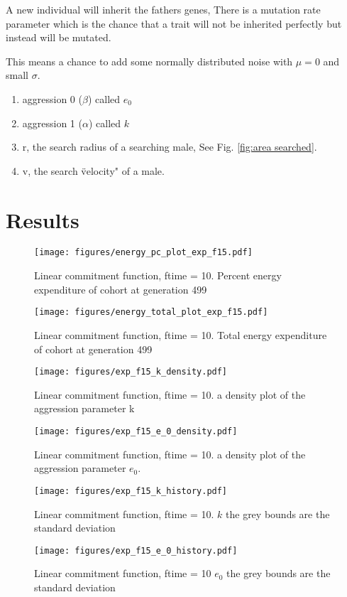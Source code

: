 \documentclass[a4paper,11pt]{article}
\begin{document}
A new individual will inherit the fathers genes,
There is a mutation rate parameter which is the chance that a trait will not be inherited perfectly but instead will be mutated.

This means a chance to add some normally distributed noise with $\mu = 0$ and small $\sigma$.

\begin{enumerate}
    \item aggression 0 ($\beta$) called $e_0$
    \item aggression 1 ($\alpha$) called $k$
    
    \item r, the search radius of a searching male, See Fig. \ref{fig:area searched}.
    \item v, the search \"velocity" of a male.
\end{enumerate}

\clearpage

\section{Results} %
\label{sec:results}
\begin{figure}[h!]
    \centering
    \texttt{[image: figures/energy\_pc\_plot\_exp\_f15.pdf]}
    \caption{Linear commitment function, ftime = 10. Percent energy expenditure of cohort at generation 499}
    \label{fig:var energy pc}
    \centering

    \texttt{[image: figures/energy\_total\_plot\_exp\_f15.pdf]}
    \caption{Linear commitment function, ftime = 10. Total energy expenditure of cohort at generation 499}
    \label{fig:var energy total}
\end{figure}

\begin{figure}[h!]
    \centering
    \texttt{[image: figures/exp\_f15\_k\_density.pdf]}
    \caption{Linear commitment function, ftime = 10. a density plot of the aggression parameter k}
    \label{fig:k density}

    \texttt{[image: figures/exp\_f15\_e\_0\_density.pdf]}
    \caption{Linear commitment function, ftime = 10. a density plot of the aggression parameter $e_0$.}
    \label{fig:e_0 density}
\end{figure}

\begin{figure}[h!]
    \centering
    \texttt{[image: figures/exp\_f15\_k\_history.pdf]}
    \caption{Linear commitment function, ftime = 10. $k$ the grey bounds are the standard deviation}

    \texttt{[image: figures/exp\_f15\_e\_0\_history.pdf]}
    \caption{Linear commitment function, ftime = 10 $e_0$ the grey bounds are the standard deviation}
\end{figure}
\end{document}
